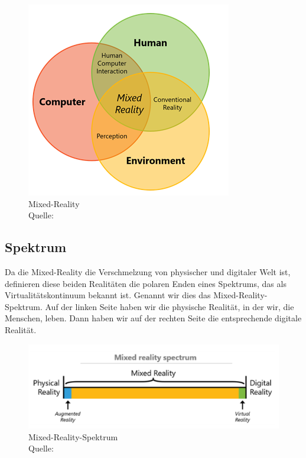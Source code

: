 \begin{figure}[ht]
	\centering
	\includegraphics[width=\textwidth,height=\textheight,keepaspectratio]{images/venndiagramm.png}
	\caption{Mixed-Reality \\ Quelle: \cite[vgl.][]{BrandonBray}}
	\label{Mixed-Reality4}
\end{figure}

\subsection{Spektrum}
Da die Mixed-Reality die Verschmelzung von physischer und digitaler Welt ist, definieren diese beiden Realitäten die polaren Enden eines Spektrums, das als Virtualitätskontinuum bekannt ist. Genannt wir dies das Mixed-Reality-Spektrum. Auf der linken Seite haben wir die physische Realität, in der wir, die Menschen, leben. Dann haben wir auf der rechten Seite die entsprechende digitale Realität.

\begin{figure}[ht]
	\centering
	\includegraphics[width=\textwidth,height=\textheight,keepaspectratio]{images/Mixed-Reality-Spektrum.png}
	\caption{Mixed-Reality-Spektrum \\ Quelle: \cite[vgl.][]{BrandonBray}}
	\label{Mixed-Reality3}
\end{figure}

